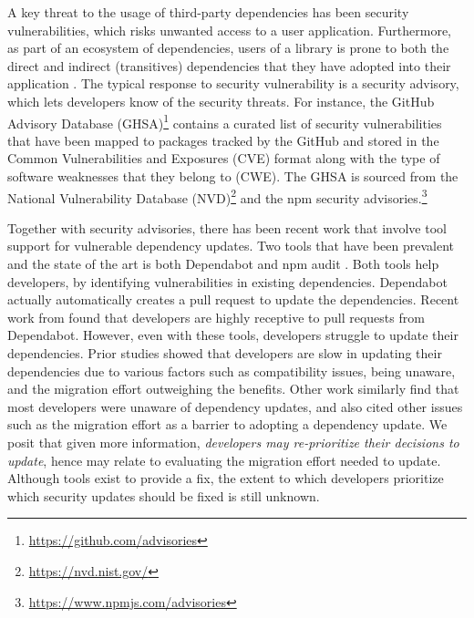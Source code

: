 \documentclass[conference]{IEEEtran}
\begin{document}
	A key threat to the usage of third-party dependencies has been security vulnerabilities, which risks unwanted access to a user application. 
	Furthermore, as part of an ecosystem of dependencies, users of a library is prone to both the direct and indirect (transitives) dependencies that they have adopted into their application \citep{Kikas:2017, Decan:2018, Chinthanet2021}. 
	The typical response to security vulnerability is a security advisory, which lets developers know of the security threats. 
	For instance, the GitHub Advisory Database (GHSA)\footnote{\url{https://github.com/advisories}} contains a curated list of security vulnerabilities that have been mapped to packages tracked by the GitHub and stored in the Common Vulnerabilities and Exposures (CVE) format along with the type of software weaknesses that they belong to (CWE). 
	The GHSA is sourced from the National Vulnerability Database (NVD)\footnote{\url{https://nvd.nist.gov/}} and the npm security advisories.\footnote{\url{https://www.npmjs.com/advisories}}
	
	Together with security advisories, there has been recent work that involve tool support for vulnerable dependency updates.
	Two tools that have been prevalent and the state of the art is both Dependabot \cite{Web:github_dependabot} and npm audit \cite{Web:npm_audit}. 
	Both tools help developers, by identifying vulnerabilities in existing dependencies. 
	Dependabot actually automatically creates a pull request to update the dependencies. 
	Recent work from \citet{Alfadel:MSR2021} found that developers are highly receptive to pull requests from Dependabot.
	However, even with these tools, developers struggle to update their dependencies. 
	Prior studies showed that developers are slow in updating their dependencies \citep{Robbes:2012, Hora:2015, Sawant2016, Bavota:2015, Ihara:2017} due to various factors such as compatibility issues, being unaware, and the migration effort outweighing the benefits.
	Other work \cite{Kula2018} similarly find that most developers were unaware of dependency updates, and also cited other issues such as the migration effort as a barrier to adopting a dependency update.
	We posit that given more information, \textit{developers may re-prioritize their decisions to update}, hence may relate to evaluating the migration effort needed to update. 
	Although tools exist to provide a fix, the extent to which developers prioritize which security updates should be fixed is still unknown.
	
\end{document}
